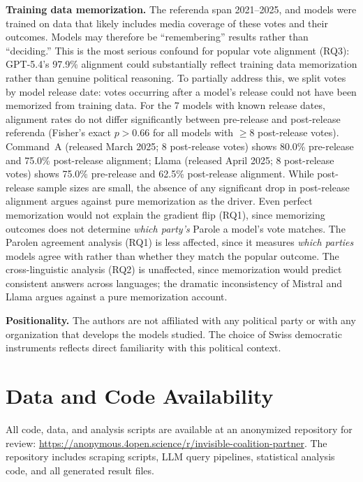 \documentclass[11pt]{article}
\begin{document}
\textbf{Training data memorization.}
The referenda span 2021--2025, and models were trained on data that likely includes media coverage of these votes and their outcomes.
Models may therefore be ``remembering'' results rather than ``deciding.''
This is the most serious confound for popular vote alignment (RQ3): GPT-5.4's 97.9\% alignment could substantially reflect training data memorization rather than genuine political reasoning.
To partially address this, we split votes by model release date: votes occurring after a model's release could not have been memorized from training data.
For the 7 models with known release dates, alignment rates do not differ significantly between pre-release and post-release referenda (Fisher's exact $p > 0.66$ for all models with $\geq 8$ post-release votes).
Command~A (released March 2025; 8 post-release votes) shows 80.0\% pre-release and 75.0\% post-release alignment; Llama (released April 2025; 8 post-release votes) shows 75.0\% pre-release and 62.5\% post-release alignment.
While post-release sample sizes are small, the absence of any significant drop in post-release alignment argues against pure memorization as the driver.
Even perfect memorization would not explain the gradient flip (RQ1), since memorizing outcomes does not determine \emph{which party's} Parole a model's vote matches.
The Parolen agreement analysis (RQ1) is less affected, since it measures \emph{which parties} models agree with rather than whether they match the popular outcome.
The cross-linguistic analysis (RQ2) is unaffected, since memorization would predict consistent answers across languages; the dramatic inconsistency of Mistral and Llama argues against a pure memorization account.

\textbf{Positionality.}
The authors are not affiliated with any political party or with any organization that develops the models studied.
The choice of Swiss democratic instruments reflects direct familiarity with this political context.

\section*{Data and Code Availability}
All code, data, and analysis scripts are available at an anonymized repository for review: \url{https://anonymous.4open.science/r/invisible-coalition-partner}.
The repository includes scraping scripts, LLM query pipelines, statistical analysis code, and all generated result files.
\end{document}
